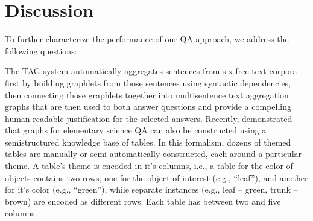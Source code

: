 \section{Discussion}
\label{sec-cl2017:discussion}

To further characterize the performance of our QA approach, we address the following questions: 


%

{} The TAG system automatically aggregates sentences from six free-text corpora first by building graphlets from those sentences using syntactic dependencies, then connecting those graphlets together into multisentence text aggregation graphs that are then used to both answer questions and provide a compelling human-readable justification for the selected answers.  Recently, \citet{Khashabi2016QuestionAV} demonstrated that graphs for elementary science QA can also be constructed using a semistructured knowledge base of tables.  In this formalism, dozens of themed tables are manually or semi-automatically constructed, each around a particular theme.  A table's theme is encoded in it's columns, i.e., a table for the color of objects contains two rows, one for the object of interest (e.g., ``leaf''), and another for it's color (e.g., ``green''), while separate instances (e.g., leaf -- green, trunk -- brown) are encoded as different rows.  Each table has between two and five columns.  

